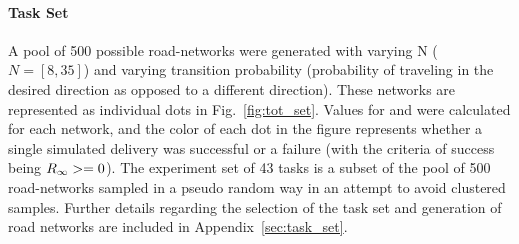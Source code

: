     \paragraph{Task Set}
    A pool of 500 possible road-networks were generated with varying N ($N=[8,35]$) and varying transition probability (probability of traveling in the desired direction as opposed to a different direction). These networks are represented as individual dots in Fig.~\ref{fig:tot_set}. Values for \xQ{} and \xO{} were calculated for each network, and the color of each dot in the figure represents whether a single simulated delivery was successful or a failure (with the criteria of success being $R_{\infty} >= 0$). The experiment set of 43 tasks is a subset of the pool of 500 road-networks sampled in a pseudo random way in an attempt to avoid clustered samples. Further details regarding the selection of the task set and generation of road networks are included in Appendix~\ref{sec:task_set}.


